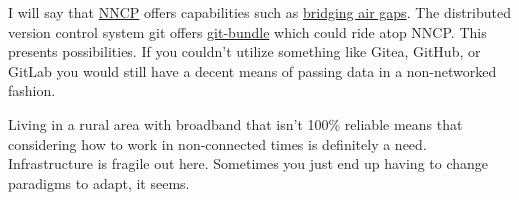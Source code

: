 I will say that
\href{https://web.archive.org/web/20230604120450/http://www.nncpgo.org/}{NNCP}
offers capabilities such as
\href{https://web.archive.org/web/20230604120647/http://www.nncpgo.org/UsecaseAirgap.html}{bridging
air gaps}. The distributed version control system git offers
\href{https://web.archive.org/web/20230604120758/https://git-scm.com/docs/git-bundle}{git-bundle}
which could ride atop NNCP. This presents possibilities. If you couldn't
utilize something like Gitea, GitHub, or GitLab you would still have a
decent means of passing data in a non-networked fashion.

Living in a rural area with broadband that isn't 100\% reliable means
that considering how to work in non-connected times is definitely a
need. Infrastructure is fragile out here. Sometimes you just end up
having to change paradigms to adapt, it seems.
